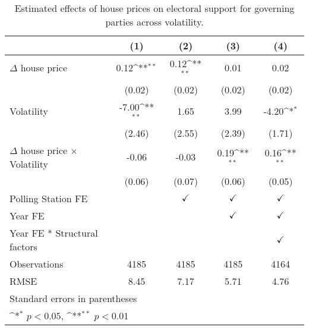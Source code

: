 \begin{table}[htbp]\centering
\def\sym#1{\ifmmode^{#1}\else\(^{#1}\)\fi}
\caption{Estimated effects of house prices on electoral support for governing parties across volatility.}
\begin{tabular}{l*{4}{c}}
\hline\hline
                    &\multicolumn{1}{c}{(1)}        &\multicolumn{1}{c}{(2)}        &\multicolumn{1}{c}{(3)}        &\multicolumn{1}{c}{(4)}        \\
\hline
$\Delta$ house price&        0.12\sym{**}&        0.12\sym{**}&        0.01        &        0.02        \\
                    &      (0.02)        &      (0.02)        &      (0.02)        &      (0.02)        \\
[1em]
Volatility          &       -7.00\sym{**}&        1.65        &        3.99        &       -4.20\sym{*} \\
                    &      (2.46)        &      (2.55)        &      (2.39)        &      (1.71)        \\
[1em]
$\Delta$ house price $\times$ Volatility&       -0.06        &       -0.03        &        0.19\sym{**}&        0.16\sym{**}\\
                    &      (0.06)        &      (0.07)        &      (0.06)        &      (0.05)        \\
[1em]
\hline Polling Station FE&                    &$\checkmark$        &$\checkmark$        &$\checkmark$        \\
[1em]
Year FE             &                    &                    &$\checkmark$        &$\checkmark$        \\
[1em]
Year FE * Structural factors&                    &                    &                    &$\checkmark$        \\
\hline
Observations        &        4185        &        4185        &        4185        &        4164        \\
RMSE                &        8.45        &        7.17        &        5.71        &        4.76        \\
\hline\hline
\multicolumn{5}{l}{\footnotesize Standard errors in parentheses}\\
\multicolumn{5}{l}{\footnotesize \sym{*} \(p<0.05\), \sym{**} \(p<0.01\)}\\
\end{tabular}
\end{table}
